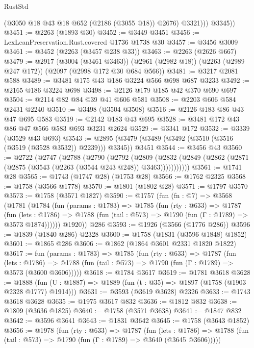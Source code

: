 \begin{lexlean}{RustStd}
\begin{coremodule}
              (@3050 @18 @43 @18 @652 (@2186 (@3055 @18)) @2676)
              @3321)))
        @3345))
@3451 := @2263 (@1893 @30)
@3452 := @3449 @3451
@3456 := LexLeanPreservation.Rust.covered @1736 @1738 @30
@3457 := @3456 @3009
@3461 := @3452 (@2263 (@3457 @238 @33))
@3463 := @2263 (@2626 @667)
@3479 := @2917
    (@3004 (@3461 @3463))
    (@2961 (@2982 @18))
    (@2263 (@2989 @247 @172))
    (@2097 (@2998 @172 @30 @684 @566))
@3481 := @3217 @2081 @588
@3489 := @3481 @175 @43 @186 @3224 @566 @698 @687 @3233
@3492 := @2165 @186 @3224 @698
@3498 := @2126 @179 @185 @42 @370 @690 @697
@3504 := @2114 @82 @84 @39 @41 @606 @581
@3508 := @2203 @606 @584 @2431 @2240
@3510 := @3498 (@3504 @3508)
@3516 := @2126 @183 @86 @43 @47 @695 @583
@3519 := @2142 @183 @43 @695
@3528 := @3481 @172 @43 @86 @47 @566 @583 @693 @3231 @2624
@3529 := @3341 @172
@3532 := @3339 (@3529 @43 @693)
@3543 := @2895 (@3479 (@3489 (@3492 (@3510 (@3516 (@3519 (@3528 @3532)) @2239))) @3345)) @3451
@3544 := @3456 @43
@3560 := @2722
    (@2747
      (@2788
        (@2790
          (@2792
            (@2809
              (@2832 (@2849 (@2862 (@2871 (@2875 (@3543 (@2263 (@3544 @243 @248)) @3463)))))))))))
@3561 := @1741 @28
@3565 := @1743 (@1747 @28) (@1753 @28)
@3566 := @1762 @2325
@3568 := @1758 (@3566 @1778)
@3570 := @1801 (@1802 @28)
@3571 := @1797 @3570
@3573 := @1758 (@3571 @1827)
@3590 := @1757
    (fun (fn : @7) =>
    @3568
      (@1781
        (@1784
          (fun (params : @1783) =>
          @1785
            (fun (rty : @633) =>
            @1787
              (fun (lets : @1786) =>
              @1788 (fun (tail : @573) => @1790 (fun (Γ : @1789) => @3573 @1874))))))
        @1920))
    @286
@3593 := @1926 (@3566 (@1776 @286))
@3596 := @1839 (@1840 @286) @2328
@3600 := @1758 (@1831 (@3596 @1848) @1852)
@3601 := @1865 @286
@3606 := @1862 (@1864 @3601 @2331 @1820 @1822)
@3617 := fun (params : @1783) =>
  @1785
    (fun (rty : @633) =>
    @1787
      (fun (lets : @1786) =>
      @1788 (fun (tail : @573) => @1790 (fun (Γ : @1789) => @3573 (@3600 @3606)))))
@3618 := @1784 @3617
@3619 := @1781 @3618
@3628 := @1888 (fun (U : @1887) => @1889 (fun (t : @35) => @1897 (@1758 (@1903 @2328 @1777) @1914)))
@3631 := @3593 (@3619 @3628) @2326
@3633 := @1743 @3618 @3628
@3635 := @1975 @3617 @832
@3636 := @1812 @832
@3638 := @1809 (@3636 @1825)
@3640 := @1758 (@3571 @3638)
@3641 := @1847 @832
@3642 := @3596 @3641
@3643 := @1831 @3642
@3645 := @1758 (@3643 @1852)
@3656 := @1978
    (fun (rty : @633) =>
    @1787
      (fun (lets : @1786) =>
      @1788 (fun (tail : @573) => @1790 (fun (Γ : @1789) => @3640 (@3645 @3606)))))

\end{coremodule}
\end{lexlean}

